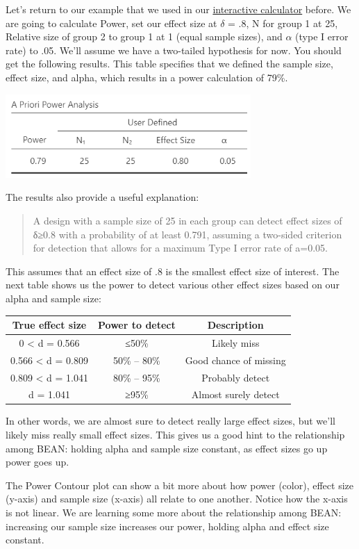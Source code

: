 \documentclass[
]{book}
\begin{document}
Let's return to our example that we used in our \href{https://rpsychologist.com/d3/pdist/}{interactive calculator} before. We are going to calculate Power, set our effect size at \(\delta\) = .8, N for group 1 at 25, Relative size of group 2 to group 1 at 1 (equal sample sizes), and \(\alpha\) (type I error rate) to .05. We'll assume we have a two-tailed hypothesis for now. You should get the following results. This table specifies that we defined the sample size, effect size, and alpha, which results in a power calculation of 79\%.

\includegraphics[width=3.67708in,height=\textheight]{images/05-bean/power-table.png}

The results also provide a useful explanation:

\begin{quote}
A design with a sample size of 25 in each group can detect effect sizes of δ≥0.8 with a probability of at least 0.791, assuming a two-sided criterion for detection that allows for a maximum Type I error rate of a=0.05.
\end{quote}

This assumes that an effect size of .8 is the smallest effect size of interest. The next table shows us the power to detect various other effect sizes based on our alpha and sample size:

\begin{longtable}[]{@{}ccc@{}}
\toprule
True effect size & Power to detect & Description\tabularnewline
\midrule
\endhead
0 \textless{} d = 0.566 & ≤50\% & Likely miss\tabularnewline
0.566 \textless{} d = 0.809 & 50\% -- 80\% & Good chance of missing\tabularnewline
0.809 \textless{} d = 1.041 & 80\% -- 95\% & Probably detect\tabularnewline
d = 1.041 & ≥95\% & Almost surely detect\tabularnewline
\bottomrule
\end{longtable}

In other words, we are almost sure to detect really large effect sizes, but we'll likely miss really small effect sizes. This gives us a good hint to the relationship among BEAN: holding alpha and sample size constant, as effect sizes go up power goes up.

The Power Contour plot can show a bit more about how power (color), effect size (y-axis) and sample size (x-axis) all relate to one another. Notice how the x-axis is not linear. We are learning some more about the relationship among BEAN: increasing our sample size increases our power, holding alpha and effect size constant.
\end{document}
